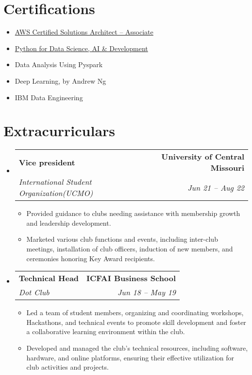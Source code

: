 \documentclass[letterpaper,11pt]{article}
\makeatletter
\newcommand{\resumeItem}[1]{
  \item\small{
    {#1 \vspace{-2pt}}
  }
}
\newcommand{\resumeSubheading}[4]{
  \vspace{-2pt}\item
    \begin{tabular*}{1.0\textwidth}[t]{l@{\extracolsep{\fill}}r}
      \textbf{#1} & \textbf{\small #2} \\
      \textit{\small#3} & \textit{\small #4} \\
    \end{tabular*}\vspace{-7pt}
}
\newcommand{\resumeSubHeadingListStart}{\begin{itemize}[leftmargin=0.0in, label={}]}
\newcommand{\resumeSubHeadingListEnd}{\end{itemize}}
\newcommand{\resumeItemListStart}{\begin{itemize}}
\newcommand{\resumeItemListEnd}{\end{itemize}\vspace{-5pt}}
\makeatother
\begin{document}
 \vspace{-3pt} 

\section{Certifications}
\begin{itemize}
    \setlength{\itemsep}{0pt}\setlength{\parskip}{2pt}
    \item \href{https://www.credly.com/badges/45cf8bee-0d91-495d-860f-ab4ef75ceabc/linked_in_profile}{AWS Certified Solutions Architect – Associate}
    \item \href{https://www.coursera.org/account/accomplishments/certificate/GJP8QRA926YB}{Python for Data Science, AI \& Development}
    \item Data Analysis Using Pyspark
    \item Deep Learning, by Andrew Ng
    \item IBM Data Engineering
\end{itemize}

\section{Extracurriculars}
    \resumeSubHeadingListStart
        \resumeSubheading
        {Vice president }{\textnormal{University of Central Missouri}}
                {International Student Organization(UCMO)}{Jun 21 -- Aug 22}
          \vspace{-3pt}
            \resumeItemListStart
                \resumeItem{Provided guidance to clubs needing assistance with membership growth and leadership development.}
                \resumeItem{Marketed various club functions and events, including inter-club meetings, installation of club officers, induction of new members, and ceremonies honoring Key Award recipients.}
\resumeItemListEnd   
        \resumeSubheading
                {Technical Head }{\textnormal{ICFAI Business School}}
        {Dot Club}{Jun 18 -- May 19}
            \resumeItemListStart
                \resumeItem{Led a team of student members, organizing and coordinating workshops, Hackathons, and technical events to promote skill development and foster a collaborative learning environment within the club.}
                \resumeItem{Developed and managed the club's technical resources, including software, hardware, and online platforms, ensuring their effective utilization for club activities and projects.}
    \resumeSubHeadingListEnd
    \resumeSubHeadingListEnd
\end{document}
